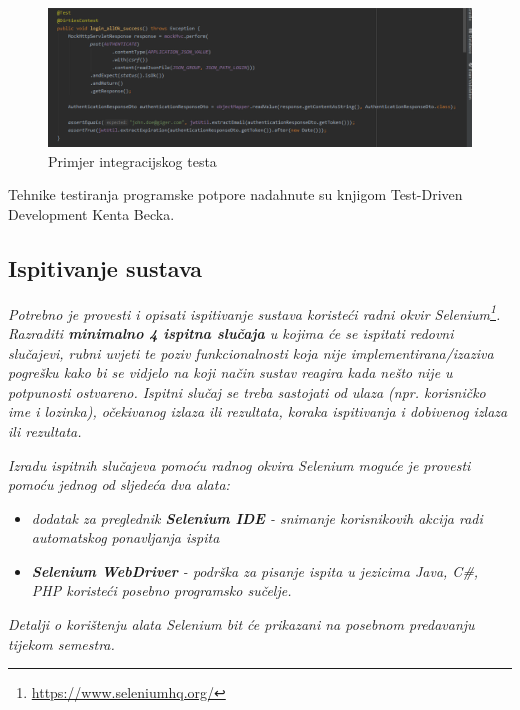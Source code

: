 			\begin{figure}[H]
				\begin{center}
					\includegraphics[width=17cm]{slike/integracijski_test.PNG}
				\end{center}
				\caption{Primjer integracijskog testa}
				\label{fig:inttest}
			\end{figure}
			
			Tehnike testiranja programske potpore nadahnute su knjigom Test-Driven Development Kenta Becka.
			
			
			
			\subsection{Ispitivanje sustava}
			
			 \textit{Potrebno je provesti i opisati ispitivanje sustava koristeći radni okvir Selenium\footnote{\url{https://www.seleniumhq.org/}}. Razraditi \textbf{minimalno 4 ispitna slučaja} u kojima će se ispitati redovni slučajevi, rubni uvjeti te poziv funkcionalnosti koja nije implementirana/izaziva pogrešku kako bi se vidjelo na koji način sustav reagira kada nešto nije u potpunosti ostvareno. Ispitni slučaj se treba sastojati od ulaza (npr. korisničko ime i lozinka), očekivanog izlaza ili rezultata, koraka ispitivanja i dobivenog izlaza ili rezultata.\\ }
			 
			 \textit{Izradu ispitnih slučajeva pomoću radnog okvira Selenium moguće je provesti pomoću jednog od sljedeća dva alata:}
			 \begin{itemize}
			 	\item \textit{dodatak za preglednik \textbf{Selenium IDE} - snimanje korisnikovih akcija radi automatskog ponavljanja ispita	}
			 	\item \textit{\textbf{Selenium WebDriver} - podrška za pisanje ispita u jezicima Java, C\#, PHP koristeći posebno programsko sučelje.}
			 \end{itemize}
		 	\textit{Detalji o korištenju alata Selenium bit će prikazani na posebnom predavanju tijekom semestra.}
			
